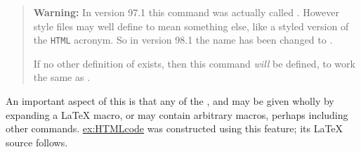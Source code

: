 \smallskip
\begin{quotation}
\textbf{Warning: } 
In version 97.1 this command was actually called .
However style files may well define  to mean something else,
like a styled version of the \texttt{HTML} acronym. 
So in version 98.1 the name has been changed to .

If no other definition of  exists, then this command \emph{will}
be defined, to work the same as . 
\end{quotation}

An important aspect of this is that any of the ,
 and  may be given wholly
by expanding a \LaTeX{} macro, or may contain arbitrary macros, 
perhaps including other  commands.
\hyperref{The following table}{The contents of Figure~}{}{ex:HTMLcode} 
was constructed using this feature; its \LaTeX{} source follows.


